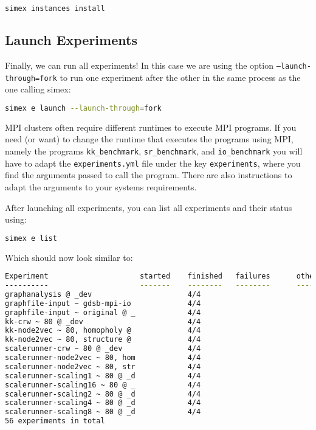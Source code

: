\documentclass[11pt, a4paper]{scrartcl}
\newcommand{\expfile}{\texttt{experiments.yml} file\xspace}
\begin{document}
\begin{lstlisting}[language=bash]
simex instances install
\end{lstlisting}

\subsection{Launch Experiments}\label{sec:getting_started:launch_experiments}

Finally, we can run all experiments! In this case we are using the option
\texttt{--launch-through=fork} to run one experiment after the other in the same
process as the one calling simex: 

\begin{lstlisting}[language=bash]
simex e launch --launch-through=fork
\end{lstlisting}

MPI clusters often require different runtimes to execute MPI programs. If you
need (or want) to change the runtime that executes the programs using MPI,
namely the programs \texttt{kk\_benchmark}, \texttt{sr\_benchmark}, and
\texttt{io\_benchmark} you will have to adapt the \expfile under the key
\texttt{experiments}, where you find the arguments passed to call the program.
There are also instructions to adapt the arguments to your systems requirements. 

After launching all experiments, you can list all experiments and their status
using:

\begin{lstlisting}[language=bash]
simex e list
\end{lstlisting}

Which should now look similar to:

\begin{lstlisting}[language=bash]
Experiment                     started    finished   failures      other
----------                     -------    --------   --------      -----
graphanalysis @ _dev                      4/4                             
graphfile-input ~ gdsb-mpi-io             4/4                             
graphfile-input ~ original @ _            4/4                             
kk-crw ~ 80 @ _dev                        4/4                             
kk-node2vec ~ 80, homopholy @             4/4                             
kk-node2vec ~ 80, structure @             4/4                             
scalerunner-crw ~ 80 @ _dev               4/4                             
scalerunner-node2vec ~ 80, hom            4/4                             
scalerunner-node2vec ~ 80, str            4/4                             
scalerunner-scaling1 ~ 80 @ _d            4/4                             
scalerunner-scaling16 ~ 80 @ _            4/4                             
scalerunner-scaling2 ~ 80 @ _d            4/4                             
scalerunner-scaling4 ~ 80 @ _d            4/4                             
scalerunner-scaling8 ~ 80 @ _d            4/4                             
56 experiments in total
\end{lstlisting}
\end{document}

